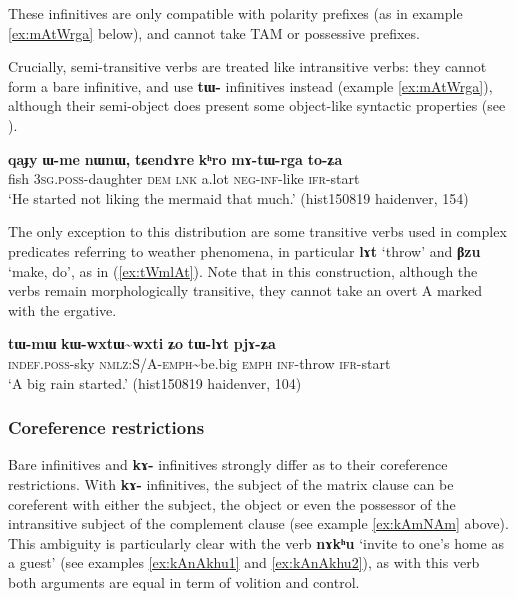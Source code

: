 \documentclass[oneside,a4paper,11pt]{article}
\newcommand{\ipa}[1]{\textbf{\phon#1}} %
\newcommand{\tld}{\textasciitilde{}}
\begin{document}
These infinitives are only compatible with polarity prefixes (as in example \ref{ex:mAtWrga} below), and cannot take TAM or possessive prefixes.

Crucially, semi-transitive verbs are treated like intransitive verbs: they cannot form a bare infinitive, and use \ipa{tɯ-} infinitives instead (example \ref{ex:mAtWrga}), although their semi-object does present some object-like syntactic properties (see \citealt{jacques16relatives}).  

\begin{exe}
\ex  \label{ex:mAtWrga}
\gll \ipa{qaɟy} 	\ipa{ɯ-me} 	\ipa{nɯnɯ,} 	\ipa{tɕendɤre} 	\ipa{kʰro} 	\ipa{mɤ-tɯ-rga} 	\ipa{to-ʑa} \\
fish \textsc{3sg.poss}-daughter \textsc{dem} \textsc{lnk} a.lot \textsc{neg-inf}-like \textsc{ifr}-start \\
\glt `He started not liking the mermaid that much.' (hist150819 haidenver, 154)
\end{exe}
 
The only exception to this distribution are some transitive verbs used in complex predicates referring to weather phenomena, in particular \ipa{lɤt} `throw' and \ipa{βzu} `make, do', as in (\ref{ex:tWmlAt}). Note that in this construction, although the verbs remain morphologically transitive, they cannot take an overt A marked with the ergative.
 
\begin{exe}
\ex  \label{ex:tWmlAt}
\gll
\ipa{tɯ-mɯ} 	\ipa{kɯ-wxtɯ\tld{}wxti} 	\ipa{ʑo} 	\ipa{tɯ-lɤt} 	\ipa{pjɤ-ʑa} \\
\textsc{indef.poss}-sky \textsc{nmlz:S/A-emph}\tld{}be.big \textsc{emph} \textsc{inf}-throw \textsc{ifr}-start \\
\glt `A big rain started.' (hist150819 haidenver, 104)
\end{exe}



\subsubsection{Coreference restrictions} \label{sec:inf.rYo}
Bare infinitives and \ipa{kɤ-} infinitives strongly differ as to their coreference restrictions. With \ipa{kɤ-} infinitives, the subject of the matrix clause can be coreferent with either the subject, the object or even the possessor of the intransitive subject of the complement clause (see example \ref{ex:kAmNAm} above). This ambiguity is particularly clear with the verb \ipa{nɤkʰu} `invite to one's home as a guest' (see examples \ref{ex:kAnAkhu1} and \ref{ex:kAnAkhu2}), as with this verb both arguments are equal in term of volition and control.
\end{document}
